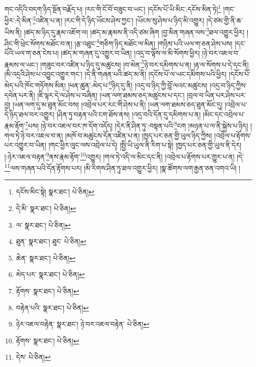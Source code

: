 གང་འདིའི་བདག་ཉིད་སྔོན་བརྗོད་པ། །རང་གི་ངོ་བོ་བཟུང་བ་ཡང་། །དངོས་པོ་ཡི་མིང་:དངོས་མིན་ཏེ།\footnote{དངོས་མིང་སྟེ།  སྣར་ཐང་།  པེ་ཅིན། } །གང་ཕྱིར་:དེ་མིན་\footnote{དེ་མི་  སྣར་ཐང་།  པེ་ཅིན། }འཛིན་པ་ན། །རང་གི་དེ་ཉིད་ཡོངས་ཤེས་ཀྱང་། །ཡོངས་སུ་ཤེས་པ་ཉིད་མི་འགྱུར། །དེ་ཙམ་གྱི་ནི་ཆ་ཡིས་ནི། །ཚད་མ་ཉིད་དུ་རྣམ་འཇོག་ལ། །ཚད་མ་རྣམས་ནི་འདི་ཙམ་ཞིག །བྱ་མིན་གཞན་ལས་\footnote{ལ་  སྣར་ཐང་།  པེ་ཅིན། }ཐལ་འགྱུར་ཕྱིར། །ཤིང་གི་ཕྲེང་སོགས་མཐོང་བ་ན། །རྩ་འཐུང་\footnote{ཐུན་  སྣར་ཐང་། ཐུང་  པེ་ཅིན། }གཅིག་ཉིད་མཐོང་ལ་མིན། །གཉིས་པའི་ཡལ་ག་ཅན་ཤེས་པས། །དང་པོའི་ཡལ་ག་ཅན་ངེས་པ། །ཚད་མ་གཞན་དུ་འགྱུར་བ་ཡིན། །འདྲ་བ་ལྟོས་ལ་མི་སོགས་ཕྱིར། །ཉེ་བར་འཇལ་བ་རྣམས་ལ་ཡང་། །གཟུང་བར་འཛིན་པ་ཉིད་དུ་མཚུངས། །བ་མེན་\footnote{ཆེན་  སྣར་ཐང་།  པེ་ཅིན། }ཉེ་བར་དམིགས་པ་ན། །རྟ་ལ་སོགས་པ་དེ་དང་ནི། །མི་འདྲའི་ཤེས་པ་འབྱུང་འགྱུར་གང་། །དེ་ནི་གཞན་པའི་ཚད་མ་ནི། །དངོས་པོ་ལ་ཡང་དམིགས་པའི་ཕྱིར། །དངོས་པོ་མེད་པའི་ཁོང་གཏོགས་མིན། །ཕན་ཚུན་:མེད་པ་\footnote{མེད་པར་  སྣར་ཐང་།  པེ་ཅིན། }ཉིད་དུ་ནི། །འདྲ་བ་ཉིད་ཀྱི་བློ་ལའང་མཚུངས། །འདྲ་བ་ཉིད་ཀྱིས་དབེན་པར་ནི། །ཇི་ལྟར་དེ་ལ་ཤེས་པ་བཞིན། །ཡན་ལག་ཐམས་ཅད་མཚུངས་པ་དང་། །བྲལ་བ་ཡིན་པར་ཤེས་པར་བྱ། །ཡན་ལག་དུ་མ་ཐུན་མོང་བས། །འབྲེལ་པར་རང་གི་ཤེས་པ་ནི། །ཡན་ལག་ཐམས་ཅད་ཐུན་མོང་དུ། །འབྲེལ་པ་དེ་ཉིད་ཐལ་བར་འགྱུར། །ཤིན་ཏུ་བརྟན་པའི་ངག་ཐོས་ནས། །འདྲ་བའི་དོན་དུ་དམིགས་པ་ན། །མིང་དང་འབྲེལ་པ་རྣམ་རྟོག་\footnote{རྟོགས་  སྣར་ཐང་།  པེ་ཅིན། }པས། །ཉེ་བར་འཇལ་བར་ཁ་དོག་འདོད། །དེར་ནི་ཤིན་ཏུ་:བསྟན་པའི་\footnote{བརྟེན་པའི་  སྣར་ཐང་།  པེ་ཅིན། }ངག །མཉན་པ་ལ་ནི་སྐྱེས་པ་ཉིད། །གལ་ཏེ་ཉེ་བར་འཇལ་བ་ན། །མཁོ་བ་མཚུངས་དོན་འཛིན་པ་ན། །ཁྱད་པར་ཅན་གྱི་ཡུལ་ཉིད་ཀྱིས། །འབྲེལ་པ་རྟོགས་པར་འགྱུར་བ་ཡིན། །གང་ཕྱིར་ལུང་ལས་འབྲེལ་པ་དེ། །སྤྱི་ཡི་ཡུལ་ནི་རིག་པ་སྟེ། །ཁྱད་པར་ཅན་གྱི་ཡུལ་ནི་དེར། །:ཉེར་འཇལ་བརྟན་\footnote{ཉེར་འཇལ་བརྟེན་  སྣར་ཐང་། ཉེ་བར་འཇལ་བརྟེན་  པེ་ཅིན། }ནས་རྣམ་རྟོག་\footnote{རྟོགས་  སྣར་ཐང་།  པེ་ཅིན། }འགྱུར། །གལ་ཏེ་འདི་ལ་མིང་དང་ནི། །འབྲེལ་པ་རྟོགས་པར་གྱུར་པ་ན། །དེ་\footnote{དེས་  པེ་ཅིན། }ལས་གཞན་པའི་དོན་རྟོགས་པར། །མི་རིགས་ཤིན་ཏུ་ཐལ་འགྱུར་ཕྱིར། །སྣ་ཚོགས་ལག་རྒྱན་ཅན་འགའ་ཡི། །
